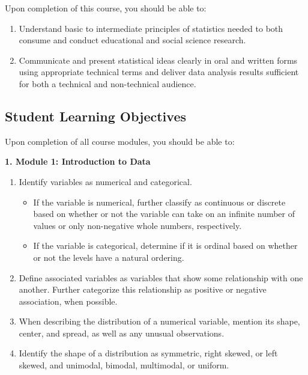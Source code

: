 \documentclass[
]{article}
\providecommand{\tightlist}{%
  \setlength{\itemsep}{0pt}\setlength{\parskip}{0pt}}
\begin{document}
Upon completion of this course, you should be able to:

\begin{enumerate}
\def\labelenumi{\arabic{enumi}.}
\tightlist
\item
  Understand basic to intermediate principles of statistics needed to
  both consume and conduct educational and social science research.
\item
  Communicate and present statistical ideas clearly in oral and written
  forms using appropriate technical terms and deliver data analysis
  results sufficient for both a technical and non-technical audience.
\end{enumerate}

\subsection{Student Learning Objectives}

Upon completion of all course modules, you should be able to:

\textbf{1. Module 1: Introduction to Data}

\begin{enumerate}
\def\labelenumi{\arabic{enumi}.}
\tightlist
\item
  Identify variables as numerical and categorical.

  \begin{itemize}
  \tightlist
  \item
    If the variable is numerical, further classify as continuous or
    discrete based on whether or not the variable can take on an
    infinite number of values or only non-negative whole numbers,
    respectively.
  \item
    If the variable is categorical, determine if it is ordinal based on
    whether or not the levels have a natural ordering.
  \end{itemize}
\item
  Define associated variables as variables that show some relationship
  with one another. Further categorize this relationship as positive or
  negative association, when possible.
\item
  When describing the distribution of a numerical variable, mention its
  shape, center, and spread, as well as any unusual observations.
\item
  Identify the shape of a distribution as symmetric, right skewed, or
  left skewed, and unimodal, bimodal, multimodal, or uniform.
\end{enumerate}
\end{document}
